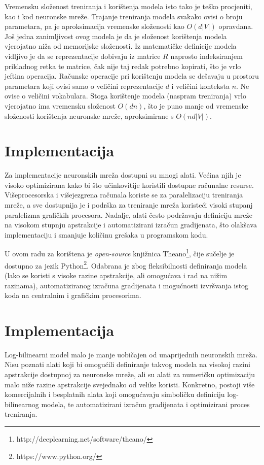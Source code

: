\documentclass[times, utf8, diplomski, numeric]{fer}
\begin{document}
Vremensku složenost treniranja i korištenja modela isto tako je teško procjeniti, kao i kod neuronske mreže. Trajanje treniranja modela svakako ovisi o broju parametara, pa je aproksimacija vremenske složenosti kao $O(d |V|)$ opravdana. Još jedna zanimljivost ovog modela je da je složenost korištenja modela vjerojatno niža od memorijske složenosti. Iz matematičke definicije modela vidljivo je da se reprezentacije dobivaju iz matrice $R$ naprosto indeksiranjem prikladnog retka te matrice, čak nije taj redak potrebno kopirati, što je vrlo jeftina operacija. Računske operacije pri korištenju modela se dešavaju u prostoru parametara koji ovisi samo o veličini reprezentacije $d$ i veličini konteksta $n$. Ne ovise o veličini vokabulara. Stoga korištenje modela (naspram treniranja) vrlo vjerojatno ima vremensku složenost $O(d n)$, što je puno manje od vremenske složenosti korištenja neuronske mreže, aproksimirane s $O(n d |V|)$.

\section{Implementacija}

Za implementacije neuronskih mreža dostupni su mnogi alati. Većina njih je visoko optimizirana kako bi što učinkovitije koristili dostupne računalne resurse. Višeprocesorska i višejezgrena računala koriste se za paralelizaciju treniranja mreže, a sve dostupnija je i podrška za treniranje mreža koristeći visoki stupanj paralelizma grafičkih procesora. Nadalje, alati često podržavaju definiciju mreže na visokom stupnju apstrakcije i automatizirani izračun gradijenata, što olakšava implementaciju i smanjuje količinu grešaka u programskom kodu.

U ovom radu za korištena je \textit{open-source} knjižnica Theano\footnote{http://deeplearning.net/software/theano/}, čije sučelje je dostupno za jezik Python\footnote{https://www.python.org/}. Odabrana je zbog fleksibilnosti definiranja modela (lako se koristi s visoke razine apstrakcije, ali omogućava i rad na nižim razinama), automatiziranog izračuna gradijenata i mogućnosti izvršvanja istog koda na centralnim i grafičkim procesorima.

\section{Implementacija}

Log-bilinearni model malo je manje uobičajen od unaprijednih neuronskih mreža. Nisu poznati alati koji bi omogućili definiranje takvog modela na visokoj razini apstrakcije dostupnoj za neuronske mreže, ali su alati za numeričku optimizaciju malo niže razine apstrakcije svejednako od velike koristi. Konkretno, postoji više komercijalnih i besplatnih alata koji omogućavaju simboličku definiciju log-bilinearnog modela, te automatizirani izračun gradijenata i optimizirani proces treniranja.
\end{document}

